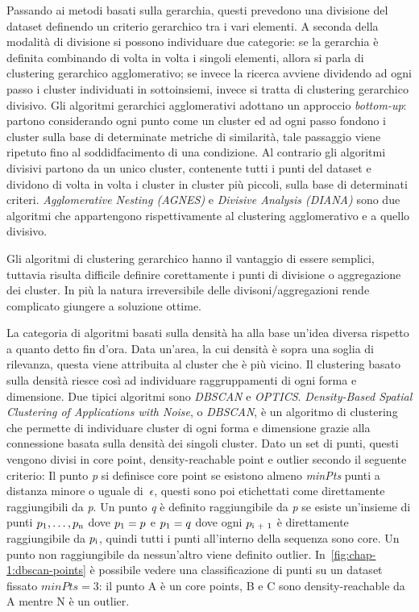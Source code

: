 Passando ai metodi basati sulla gerarchia, questi prevedono una divisione del dataset definendo un criterio gerarchico tra i vari elementi.
A seconda della modalità di divisione si possono individuare due categorie: se la gerarchia è definita combinando di volta in volta i singoli elementi,
allora si parla di clustering gerarchico agglomerativo; se invece la ricerca avviene dividendo ad ogni passo i cluster individuati in sottoinsiemi, invece
si tratta di clustering gerarchico divisivo.
Gli algoritmi gerarchici agglomerativi adottano un approccio \textit{bottom-up}: partono considerando ogni punto come un cluster ed ad ogni passo fondono i cluster sulla base di determinate metriche
di similarità, tale passaggio viene ripetuto fino al soddidfacimento di una condizione.
Al contrario gli algoritmi divisivi partono da un unico cluster, contenente tutti i punti del dataset e dividono di volta
in volta i cluster in cluster più piccoli, sulla base di determinati criteri.
\textit{Agglomerative Nesting (AGNES)}\cite{kaufman2008agglomerative} e \textit{Divisive Analysis (DIANA)}\cite{kaufman2008divisive} sono due algoritmi che
appartengono rispettivamente al clustering agglomerativo e a quello divisivo.

Gli algoritmi di clustering gerarchico hanno il vantaggio di essere semplici, tuttavia risulta
difficile definire corettamente i punti di divisione o aggregazione dei cluster.
In più la natura irreversibile delle divisoni/aggregazioni rende complicato giungere a soluzione ottime.

La categoria di algoritmi basati sulla densità ha alla base un'idea diversa rispetto a quanto detto fin d'ora.
Data un'area, la cui densità è sopra una soglia di rilevanza, questa viene attribuita al cluster che è più vicino.
Il clustering basato sulla densità riesce così ad individuare raggruppamenti di ogni forma e dimensione.
Due tipici algoritmi sono \textit{DBSCAN}\cite{ester1996density} e \textit{OPTICS}\cite{ankerst1999optics}.
\textit{Density-Based Spatial Clustering of Applications with Noise}, o \textit{DBSCAN}, è un algoritmo
di clustering che permette di individuare cluster di ogni forma e dimensione grazie alla connessione basata sulla densità dei singoli cluster.
Dato un set di punti, questi vengono divisi in core point, density-reachable point e outlier secondo il seguente criterio:
Il punto \textit{p} si definisce core point se esistono almeno \textit{minPts} punti a distanza minore o uguale di
\(~\epsilon \), questi sono poi etichettati come direttamente raggiungibili da \textit{p}.
Un punto \textit{q} è definito raggiungibile da \textit{p} se esiste un'insieme di punti
\(p\textsubscript{1},\ldots, p\textsubscript{n}\) dove \(p\textsubscript{1} = p \) e
\(p\textsubscript{1} = q \) dove ogni \(p\textsubscript{i + 1}\) è direttamente raggiungibile da
\(p\textsubscript{i}\), quindi tutti i punti all'interno della sequenza sono core.
Un punto non raggiungibile da nessun'altro viene definito outlier.
In~\cref*{fig:chap-1:dbscan-points} è possibile vedere una classificazione di punti su un dataset fissato
\(minPts=3\): il punto A è un core points, B e C sono density-reachable da A mentre N è un outlier.

